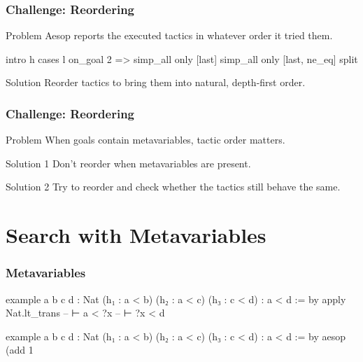 \documentclass[xetex]{beamer}
\begin{document}
\begin{frame}[fragile]
  \frametitle{Challenge: Reordering}

  \begin{block}{Problem}
    Aesop reports the executed tactics in whatever order it tried them.

    \begin{leancode}
      intro h
      cases l
      on_goal 2 => simp_all only [last]
      simp_all only [last, ne_eq]
      split
    \end{leancode}
  \end{block}

  \pause

  \begin{block}{Solution}
    Reorder tactics to bring them into natural, depth-first order.
  \end{block}
\end{frame}

\begin{frame}
  \frametitle{Challenge: Reordering}

  \begin{block}{Problem}
    When goals contain metavariables, tactic order matters.
  \end{block}

  \pause

  \begin{block}{Solution 1}
    Don't reorder when metavariables are present.
  \end{block}

  \pause

  \begin{block}{Solution 2}
    Try to reorder and check whether the tactics still behave the same.
  \end{block}
\end{frame}

\section{Search with Metavariables}

\begin{frame}[fragile]
  \frametitle{Metavariables}

  \begin{leancode}
    example {a b c d : Nat} (h₁ : a < b)
        (h₂ : a < c) (h₃ : c < d) : a < d := by
      apply Nat.lt_trans
      -- ⊢ a < ?x
      -- ⊢ ?x < d

    example {a b c d : Nat} (h₁ : a < b)
        (h₂ : a < c) (h₃ : c < d) : a < d := by
      aesop (add 1%
  \end{leancode}
\end{frame}
\end{document}
